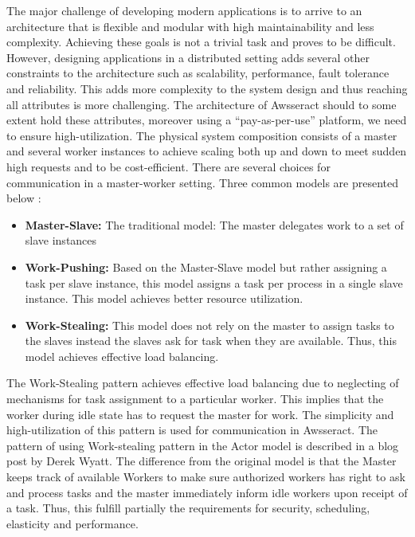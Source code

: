 \documentclass[conference]{IEEEtran}
\begin{document}
The major challenge of developing modern applications is to arrive to an architecture that is flexible and modular with high maintainability and less complexity. Achieving these goals is not a trivial task and proves to be difficult. However, designing applications in a distributed setting adds several other constraints to the architecture such as scalability, performance, fault tolerance and reliability. This adds more complexity to the system design and thus reaching all attributes is more challenging. The architecture of Awsseract should to some extent hold these attributes, moreover using a “pay-as-per-use” platform, we need to ensure high-utilization. The physical system composition consists of a master and several worker instances to achieve scaling both up and down to meet sudden high requests and to be cost-efficient. There are several choices for communication in a master-worker setting. Three common models are presented below \cite{com}: \\



\begin{itemize}
  \item \textbf{Master-Slave:} The traditional model: The master delegates work to a set of slave instances
  \item \textbf{Work-Pushing:} Based on the Master-Slave model but rather assigning a task per slave instance, this model assigns a task per process in a single slave instance. This model achieves better resource utilization.

  \item \textbf{Work-Stealing:} This model does not rely on the master to assign tasks to the slaves instead the slaves ask for task when they are available. Thus, this model achieves effective load balancing. \\

\end{itemize} 

The Work-Stealing pattern achieves effective load balancing due to neglecting of mechanisms for task assignment to a particular worker. This implies that the worker during idle state has to request the master for work. The simplicity and high-utilization of this pattern is used for communication in Awsseract. The pattern of using Work-stealing pattern in the Actor model is described in a blog post \cite{wyatt} by Derek Wyatt. The difference from the original model is that the Master keeps track of available Workers to make sure authorized workers has right to ask and process tasks and the master immediately inform idle workers upon receipt of a task. Thus, this fulfill partially the requirements for security, scheduling, elasticity and performance.   \\
\end{document}
